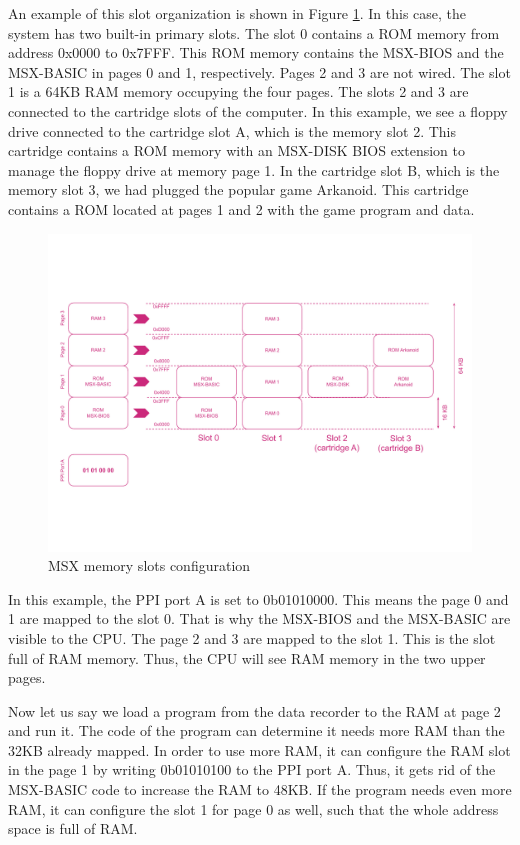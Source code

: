 An example of this slot organization is shown in Figure \ref{fig:msx-mem-slotsprim}. In this case, the system has two built-in primary slots. The slot 0 contains a ROM memory from address 0x0000 to 0x7FFF. This ROM memory contains the MSX-BIOS and the MSX-BASIC in pages 0 and 1, respectively. Pages 2 and 3 are not wired. The slot 1 is a 64KB RAM memory occupying the four pages. The slots 2 and 3 are connected to the cartridge slots of the computer. In this example, we see a floppy drive connected to the cartridge slot A, which is the memory slot 2. This cartridge contains a ROM memory with an MSX-DISK BIOS extension to manage the floppy drive at memory page 1. In the cartridge slot B, which is the memory slot 3, we had plugged the popular game Arkanoid. This cartridge contains a ROM located at pages 1 and 2 with the game program and data. 

\begin{figure}
	\centering
	\includegraphics[width=1\linewidth,trim={0cm 100 0 80}]{images/figures/msx-mem-slotsprim}
	\caption{MSX memory slots configuration}
	\label{fig:msx-mem-slotsprim}
\end{figure}

In this example, the PPI port A is set to 0b01010000. This means the page 0 and 1 are mapped to the slot 0. That is why the MSX-BIOS and the MSX-BASIC are visible to the CPU. The page 2 and 3 are mapped to the slot 1. This is the slot full of RAM memory. Thus, the CPU will see RAM memory in the two upper pages. 

Now let us say we load a program from the data recorder to the RAM at page 2 and run it. The code of the program can determine it needs more RAM than the 32KB already mapped. In order to use more RAM, it can configure the RAM slot in the page 1 by writing 0b01010100 to the PPI port A. Thus, it gets rid of the MSX-BASIC code to increase the RAM to 48KB. If the program needs even more RAM, it can configure the slot 1 for page 0 as well, such that the whole address space is full of RAM. 

